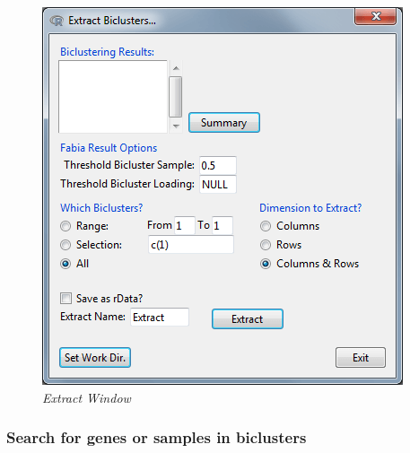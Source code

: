 \documentclass[a4paper]{article}\usepackage[]{graphicx}\usepackage[]{color}
\begin{document}
\begin{figure}[H]
\centering
\includegraphics[scale=0.5]{figures/extractwindow.png}
\caption{{\it Extract Window}\label{extractwindow}}
\end{figure}

\subsubsection{Search for genes or samples in biclusters}
\end{document}
